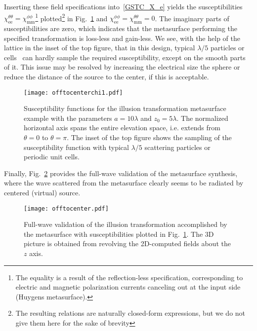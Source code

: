 \documentclass[journal,transaction]{IEEEtran}
\newcommand{\figref}{Fig.~\ref}
\begin{document}
Inserting these field specifications into~\eqref{GSTC_X_e} yields the susceptibilities $\chi_\text{ee}^{\theta\theta}=\chi_\text{mm}^{\phi\phi}$\footnote{The equality is a result of the reflection-less specification, corresponding to electric and magnetic polarization currents canceling out at the input side (Huygens metasurface).} plotted\footnote{The resulting relations are naturally closed-form expressions, but we do not give them here for the sake of brevity} in \figref{FIG:offtocenterchi1} and $\chi_\text{ee}^{\phi\phi}=\chi_\text{mm}^{\theta\theta}=0$. The imaginary parts of susceptibilities are zero, which indicates that the metasurface performing the specified transformation is loss-less and gain-less. We see, with the help of the lattice in the inset of the top figure, that in this design, typical $\lambda/5$ particles or cells~\cite{2017_12_Achouri_Nanophotonics} can hardly sample the required susceptibility, except on the smooth parts of it. This issue may be resolved by increasing the electrical size the sphere or reduce the distance of the source to the center, if this is acceptable.
%
\begin{figure}[!h]
    \centering
         \texttt{[image: offtocenterchi1.pdf]}{
        }
        \caption{Susceptibility functions for the illusion transformation metasurface example with the parameters $a=10\lambda$ and $z_0=5\lambda$. The normalized horizontal axis spans the entire elevation space, i.e. extends from $\theta=0$ to $\theta=\pi$. The inset of the top figure shows the sampling of the susceptibility function with typical $\lambda/5$ scattering particles or periodic unit cells.}
   \label{FIG:offtocenterchi1}
\end{figure}

Finally, \figref{FIG:offtocenter} provides the full-wave validation of the metasurface synthesis, where the wave scattered from the metasurface clearly seems to be radiated by centered (virtual) source.
%
\begin{figure}[!h]
    \centering
         \texttt{[image: offtocenter.pdf]}{
        }
        \caption{Full-wave validation of the illusion transformation accomplished by the metasurface with susceptibilities plotted in \figref{FIG:offtocenterchi1}. The 3D picture is obtained from revolving the 2D-computed fields about the $z$ axis.}
   \label{FIG:offtocenter}
\end{figure}
\end{document}
